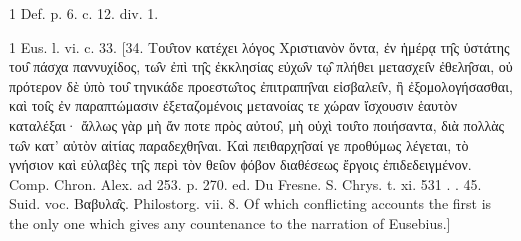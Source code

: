 1
Def. p. 6. c. 12. div. 1.

1
Eus. l. vi. c. 33. [34. Του̑τον κατέχει λόγος Χριστιανὸν ὄντα, ἐν ἡμέρᾳ τη̑ς ὑστάτης του̑ πάσχα παννυχίδος, τω̑ν ἐπὶ τη̑ς ἐκκλησίας εὐχω̑ν τῳ̑ πλήθει μετασχει̑ν ἐθελη̑σαι, οὐ πρότερον δὲ ὑπὸ του̑ τηνικάδε προεστω̑τος ἐπιτραπη̑ναι εἰσβαλει̑ν, ἢ ἐξομολογήσασθαι, καὶ τοι̑ς ἐν παραπτώμασιν ἐξεταζομένοις μετανοίας τε χώραν ἴσχουσιν ἑαυτὸν καταλέξαι· ἄλλως γὰρ μὴ ἄν ποτε πρὸς αὐτου̑, μὴ οὐχὶ του̑το ποιήσαντα, διὰ πολλὰς τω̑ν κατ’ αὐτὸν αἰτίας παραδεχθη̑ναι. Καὶ πειθαρχη̑σαί γε προθύμως λέγεται, τὸ γνήσιον καὶ εὐλαβὲς τη̑ς περὶ τὸν θει̑ον ϕόβον διαθέσεως ἔργοις ἐπιδεδειγμένον. Comp. Chron. Alex. ad 253. p. 270. ed. Du Fresne. S. Chrys. t. xi. 531 . . 45. Suid. voc. Βαβυλα̑ς. Philostorg. vii. 8. Of which conflicting accounts the first is the only one which gives any countenance to the narration of Eusebius.]

